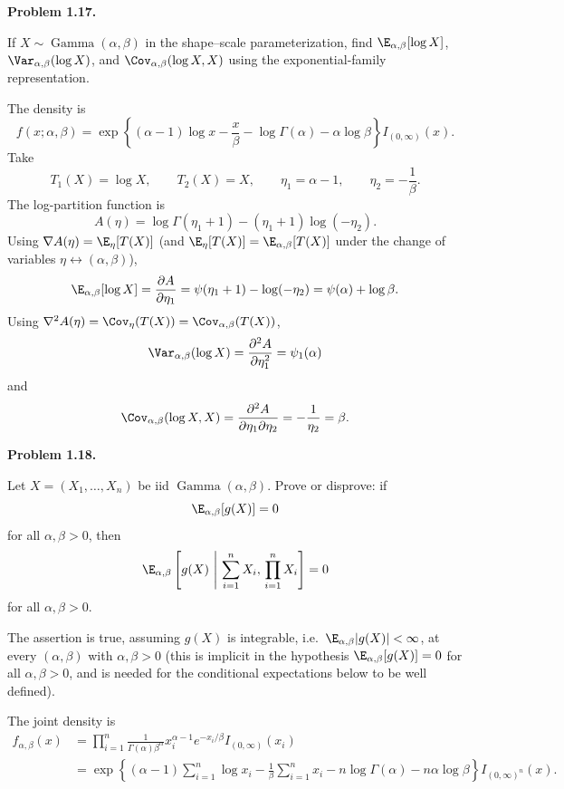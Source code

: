 \documentclass[answers,12pt,addpoints]{exam}
\begin{document}
\begin{questions}
\question[0] \textbf{Problem 1.17.}

If $X\sim\operatorname{Gamma}(\alpha,\beta)$ in the shape--scale parameterization,
find $\E_{\alpha,\beta}[\log X]$, $\Var_{\alpha,\beta}(\log X)$, and
$\Cov_{\alpha,\beta}(\log X,X)$ using the exponential-family representation.

\begin{solution}
The density is
\[
f(x;\alpha,\beta)
=
\exp\left\{
(\alpha-1)\log x-\frac{x}{\beta}
-\log\Gamma(\alpha)-\alpha\log\beta
\right\}I_{(0,\infty)}(x).
\]
Take
\[
T_1(X)=\log X,
\qquad
T_2(X)=X,
\qquad
\eta_1=\alpha-1,
\qquad
\eta_2=-\frac1\beta.
\]
The log-partition function is
\[
A(\eta)
=\log\Gamma(\eta_1+1)-(\eta_1+1)\log(-\eta_2).
\]
Using $\nabla A(\eta)=\E_\eta[T(X)]$ (and $\E_\eta[T(X)]=\E_{\alpha,\beta}[T(X)]$
under the change of variables $\eta\leftrightarrow(\alpha,\beta)$),
\[
\E_{\alpha,\beta}[\log X]
=\frac{\partial A}{\partial\eta_1}
=\psi(\eta_1+1)-\log(-\eta_2)
=\psi(\alpha)+\log\beta.
\]
Using $\nabla^2A(\eta)=\Cov_\eta(T(X))=\Cov_{\alpha,\beta}(T(X))$,
\[
\Var_{\alpha,\beta}(\log X)
=\frac{\partial^2A}{\partial\eta_1^2}
=\psi_1(\alpha)
\]
and
\[
\Cov_{\alpha,\beta}(\log X,X)
=\frac{\partial^2A}{\partial\eta_1\partial\eta_2}
=-\frac1{\eta_2}
=\beta.
\]
\end{solution}

\question[0] \textbf{Problem 1.18.}

Let $X=(X_1,\ldots,X_n)$ be iid
$\operatorname{Gamma}(\alpha,\beta)$. Prove or disprove: if
\[
\E_{\alpha,\beta}[g(X)]=0
\]
for all $\alpha,\beta>0$, then
\[
\E_{\alpha,\beta}\left[
g(X)
\ \middle|\
\sum_{i=1}^n X_i,\,
\prod_{i=1}^n X_i
\right]=0
\]
for all $\alpha,\beta>0$.

\begin{solution}
The assertion is true, assuming $g(X)$ is integrable, i.e.\
$\E_{\alpha,\beta}|g(X)|<\infty$, at every $(\alpha,\beta)$ with $\alpha,\beta>0$
(this is implicit in the hypothesis $\E_{\alpha,\beta}[g(X)]=0$ for all
$\alpha,\beta>0$, and is needed for the conditional expectations below to be
well defined).

The joint density is
\begin{align*}
f_{\alpha,\beta}(x)
&=
\prod_{i=1}^n
\frac{1}{\Gamma(\alpha)\beta^\alpha}
x_i^{\alpha-1}e^{-x_i/\beta}
I_{(0,\infty)}(x_i)
\\
&=
\exp\left\{
(\alpha-1)\sum_{i=1}^n\log x_i
-\frac{1}{\beta}\sum_{i=1}^n x_i
-n\log\Gamma(\alpha)
-n\alpha\log\beta
\right\}
I_{(0,\infty)^n}(x).
\end{align*}


\end{solution}
\end{questions}
\end{document}
